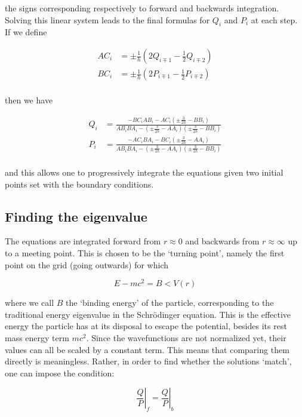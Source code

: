 \documentclass[]{report}
\begin{document}
the signs corresponding respectively to forward and backwards integration. Solving this linear system leads to the final formulas for $Q_i$ and $P_i$ at each step. If we define

\begin{align}
AC_i &= \pm\frac{1}{h}\left(2Q_{i\mp1}-\frac{1}{2}Q_{i\mp2}\right) \\
BC_i &= \pm\frac{1}{h}\left(2P_{i\mp1}-\frac{1}{2}P_{i\mp2}\right) \\
\end{align}

then we have

\begin{align}
Q_i &= \frac{-BC_iAB_i-AC_i(\pm\frac{3}{2h}-BB_i)}{AB_iBA_i-(\pm\frac{3}{2h}-AA_i)(\pm\frac{3}{2h}-BB_i)} \\
P_i &= \frac{-AC_iBA_i-BC_i(\pm\frac{3}{2h}-AA_i)}{AB_iBA_i-(\pm\frac{3}{2h}-AA_i)(\pm\frac{3}{2h}-BB_i)} \\
\end{align}

and this allows one to progressively integrate the equations given two initial points set with the boundary conditions.

\subsection{Finding the eigenvalue}

The equations are integrated forward from $r\approx0$ and backwards from $r\approx\infty$ up to a meeting point. This is chosen to be the `turning point', namely the first point on the grid (going outwards) for which

\begin{equation}
E-mc^2 = B < V(r)
\end{equation}

where we call $B$ the `binding energy' of the particle, corresponding to the traditional energy eigenvalue in the Schr\"{o}dinger equation. This is the effective energy the particle has at its disposal to escape the potential, besides its rest mass energy term $mc^2$.\newline
Since the wavefunctions are not normalized yet, their values can all be scaled by a constant term. This means that comparing them directly is meaningless. Rather, in order to find whether the solutions `match', one can impose the condition:

\begin{equation}
\left. \frac{Q}{P}\right|_f = \left. \frac{Q}{P}\right|_b
\end{equation}
\end{document}
